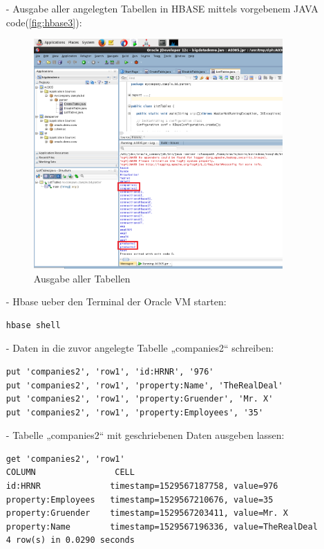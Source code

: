 \begin{itemize}
\item[-] Ausgabe aller angelegten Tabellen in HBASE mittels vorgebenem JAVA code(\autoref{fig:hbase3}):
\begin{figure}[!htb]
        \begin{minipage}{1\textwidth}
                \centering
                \includegraphics[width=0.90\textwidth]{pics/hbase3.png}\par\vspace{0cm}
                \caption{Ausgabe aller Tabellen}
                \label{fig:hbase3}
        \end{minipage}
\end{figure}

\item[-] Hbase ueber den Terminal der Oracle VM starten:
\begin{lstlisting}
hbase shell
\end{lstlisting}

\item[-] Daten in die zuvor angelegte Tabelle „companies2“ schreiben:
\begin{lstlisting}
put 'companies2', 'row1', 'id:HRNR', '976'
put 'companies2', 'row1', 'property:Name', 'TheRealDeal'
put 'companies2', 'row1', 'property:Gruender', 'Mr. X'
put 'companies2', 'row1', 'property:Employees', '35'
\end{lstlisting}

\item[-] Tabelle „companies2“ mit geschriebenen Daten ausgeben lassen:
\begin{lstlisting}
get 'companies2', 'row1'
COLUMN                CELL
id:HRNR              timestamp=1529567187758, value=976
property:Employees   timestamp=1529567210676, value=35
property:Gruender    timestamp=1529567203411, value=Mr. X
property:Name        timestamp=1529567196336, value=TheRealDeal
4 row(s) in 0.0290 seconds
\end{lstlisting}


\end{itemize}

